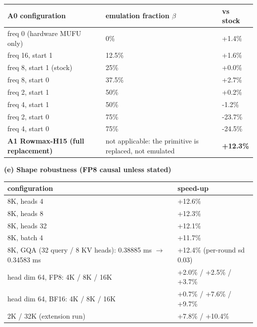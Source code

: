 {\scriptsize
\setlength{\tabcolsep}{2pt}
\begin{longtable}{@{}lll@{}}
\toprule
\textbf{A0 configuration} & \textbf{emulation fraction $\beta$} & \textbf{vs stock} \\
\midrule
\endhead
freq 0 (hardware MUFU only) & 0\% & +1.4\% \\
freq 16, start 1 & 12.5\% & +1.6\% \\
freq 8, start 1 (stock) & 25\% & +0.0\% \\
freq 8, start 0 & 37.5\% & +2.7\% \\
freq 2, start 1 & 50\% & +0.2\% \\
freq 4, start 1 & 50\% & -1.2\% \\
freq 2, start 0 & 75\% & -23.7\% \\
freq 4, start 0 & 75\% & -24.5\% \\
\textbf{A1 Rowmax-H15 (full replacement)} & not applicable: the primitive is replaced, not emulated & \textbf{+12.3\%} \\
\bottomrule
\end{longtable}
\addtocounter{table}{-1}
}
\par\smallskip\noindent\textbf{(e) Shape robustness (FP8 causal unless stated)}\par\nopagebreak
{\scriptsize
\setlength{\tabcolsep}{2pt}
\begin{longtable}{@{}ll@{}}
\toprule
\textbf{configuration} & \textbf{speed-up} \\
\midrule
\endhead
8K, heads 4 & +12.6\% \\
8K, heads 8 & +12.3\% \\
8K, heads 32 & +12.1\% \\
8K, batch 4 & +11.7\% \\
8K, GQA (32 query / 8 KV heads): 0.38885 ms $\rightarrow$ 0.34583 ms & +12.4\% (per-round sd 0.03) \\
head dim 64, FP8: 4K / 8K / 16K & +2.0\% / +2.5\% / +3.7\% \\
head dim 64, BF16: 4K / 8K / 16K & +0.7\% / +7.6\% / +9.7\% \\
2K / 32K (extension run) & +7.8\% / +10.4\% \\
\bottomrule
\end{longtable}
\addtocounter{table}{-1}
}
\par{}\par
